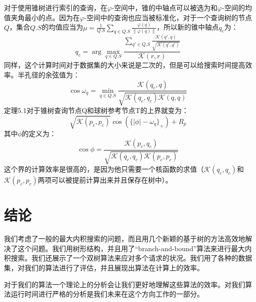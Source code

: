 \documentclass[twocolumn,a4paper]{article}
\begin{document}
对于使用锥树进行索引的查询，在$\varphi$-空间中，锥的中轴点可以被选为和$\varphi$-空间的均值夹角最小的点。因为在$\varphi$-空间中的查询也应当被标准化，对于一个查询树的节点$Q$，集合$Q.S$的均值应当为$\mu=\frac{1}{Q.S}\sum_{q \in Q.S}\frac{\varphi(q)}{\|\varphi(q)\|}$，所以新的锥中轴点$q_c$为：
\begin{equation}
q_c = \arg \max_{q\in Q.S}\frac{\sum_{q'\in Q.S}\frac{\mathcal{K}(q',q)}{\sqrt{\mathcal{K}(q',q')}}}{\mathcal{K}(r,r)}
\end{equation}
同样，这个计算时间对于数据集的大小来说是二次的，但是可以给搜索时间提高效率。半孔径的余弦值为：
\begin{equation}
\cos\omega_q = \min_{q \in Q.S}\frac{\mathcal{K}(q_c, q)}{\sqrt{\mathcal{K}(q_c, q_c)\mathcal{K}(q,q)}}
\end{equation}
定理5.1对于锥树查询节点Q和球树参考节点T的上界就变为：
\begin{equation}
\sqrt{\mathcal{K}(p_c, p_c)}\cos(\{|\phi| - \omega_q\}_+) + R_p
\end{equation}
其中$\phi$的定义为：
\begin{equation*}
\cos\phi = \frac{\mathcal{K}(p_c, q_c)}{\sqrt{\mathcal{K}(q_c, q_c)\mathcal{K}(p_c,p_c)}}
\end{equation*}
这个界的计算效率是很高的，是因为他只需要一个核函数的求值（$\mathcal{K}(q_c, q_c)$和$\mathcal{K}(p_c,p_c)$两项可以被提前计算出来并且保存在树中）。

\section{结论}

我们考虑了一般的最大内积搜索的问题，而且用几个新颖的基于树的方法高效地解决了这个问题。我们用树形结构，并且用了“branch-and-bound”算法来进行最大内积搜索。我们还展示了一个双树算法来应对多个请求的状况。我们用了各种的数据集，对我们的算法进行了评估，并且展现出算法在计算上的效率。

对于我们的算法一个理论上的分析会让我们更好地理解这些算法的效率。对我们算法运行时间进行严格的分析是我们未来在这个方向工作的一部分。
\end{document}
